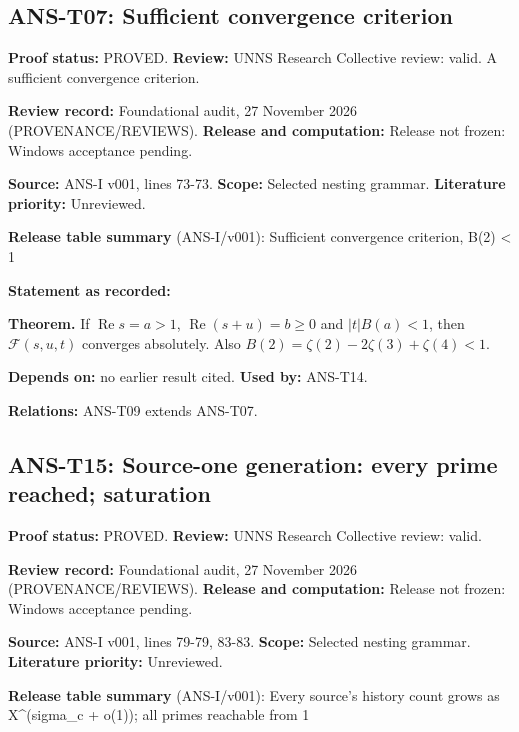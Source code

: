 \documentclass[
  11pt,
]{article}
\begin{document}
\hypertarget{ans-t07-sufficient-convergence-criterion}{%
\subsection{ANS-T07: Sufficient convergence
criterion}\label{ans-t07-sufficient-convergence-criterion}}

\textbf{Proof status:} PROVED. \textbf{Review:} UNNS Research Collective
review: valid. A sufficient convergence criterion.

\textbf{Review record:} Foundational audit, 27 November 2026
(PROVENANCE/REVIEWS). \textbf{Release and computation:} Release not
frozen: Windows acceptance pending.

\textbf{Source:} ANS-I v001, lines 73-73. \textbf{Scope:} Selected
nesting grammar. \textbf{Literature priority:} Unreviewed.

\textbf{Release table summary} (ANS-I/v001): Sufficient convergence
criterion, B(2) \textless{} 1

\textbf{Statement as recorded:}

\textbf{Theorem.} If \(\operatorname{Re}s=a>1\),
\(\operatorname{Re}(s+u)=b\ge0\) and \(|t|B(a)<1\), then
\(\mathcal F(s,u,t)\) converges absolutely. Also
\(B(2)=\zeta(2)-2\zeta(3)+\zeta(4)<1\).

\textbf{Depends on:} no earlier result cited. \textbf{Used by:} ANS-T14.

\textbf{Relations:} ANS-T09 extends ANS-T07.

\hypertarget{ans-t15-source-one-generation-every-prime-reached-saturation}{%
\subsection{ANS-T15: Source-one generation: every prime reached;
saturation}\label{ans-t15-source-one-generation-every-prime-reached-saturation}}

\textbf{Proof status:} PROVED. \textbf{Review:} UNNS Research Collective
review: valid.

\textbf{Review record:} Foundational audit, 27 November 2026
(PROVENANCE/REVIEWS). \textbf{Release and computation:} Release not
frozen: Windows acceptance pending.

\textbf{Source:} ANS-I v001, lines 79-79, 83-83. \textbf{Scope:}
Selected nesting grammar. \textbf{Literature priority:} Unreviewed.

\textbf{Release table summary} (ANS-I/v001): Every source's history
count grows as X\^{}(sigma\_c + o(1)); all primes reachable from 1
\end{document}
